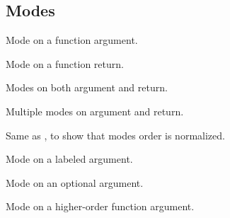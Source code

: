 \subsection{Modes\label{Oxcaml--modes}}%
\label{Oxcaml--val-mode_arg}\begin{ocamlindent}Mode on a function argument.\end{ocamlindent}%
\medbreak
\label{Oxcaml--val-mode_ret}\begin{ocamlindent}Mode on a function return.\end{ocamlindent}%
\medbreak
\label{Oxcaml--val-mode_both}\begin{ocamlindent}Modes on both argument and return.\end{ocamlindent}%
\medbreak
\label{Oxcaml--val-mode_multi}\begin{ocamlindent}Multiple modes on argument and return.\end{ocamlindent}%
\medbreak
\label{Oxcaml--val-mode_multi_flipped}\begin{ocamlindent}Same as , to show that modes order is normalized.\end{ocamlindent}%
\medbreak
\label{Oxcaml--val-mode_labeled}\begin{ocamlindent}Mode on a labeled argument.\end{ocamlindent}%
\medbreak
\label{Oxcaml--val-mode_optional}\begin{ocamlindent}Mode on an optional argument.\end{ocamlindent}%
\medbreak
\label{Oxcaml--val-mode_higher_order}\begin{ocamlindent}Mode on a higher-order function argument.\end{ocamlindent}%
